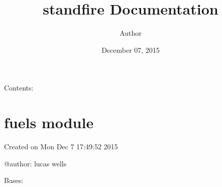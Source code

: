 \documentclass[letterpaper,10pt,english]{sphinxmanual}
\title{standfire Documentation}
\date{December 07, 2015}
\author{Author}
\begin{document}
\maketitle
\tableofcontents
{}\label{index::doc}


Contents:


\chapter{fuels module}
\label{fuels:welcome-to-standfire-s-documentation}\label{fuels:module-fuels}\label{fuels::doc}\label{fuels:fuels-module}
Created on Mon Dec  7 17:49:52 2015

@author: lucas wells

\begin{fulllineitems}
\label{fuels:fuels.Fvsfuels}
Bases: 

\begin{fulllineitems}
\label{fuels:fuels.Fvsfuels.get_obj_data}
\end{fulllineitems}


\begin{fulllineitems}
\label{fuels:fuels.Fvsfuels.get_simulation_years}
\end{fulllineitems}


\begin{fulllineitems}
\label{fuels:fuels.Fvsfuels.get_snags}
\end{fulllineitems}


\begin{fulllineitems}
\label{fuels:fuels.Fvsfuels.get_spcodes}
\end{fulllineitems}


\begin{fulllineitems}
\label{fuels:fuels.Fvsfuels.get_standid}
\end{fulllineitems}


\end{fulllineitems}
\end{document}
